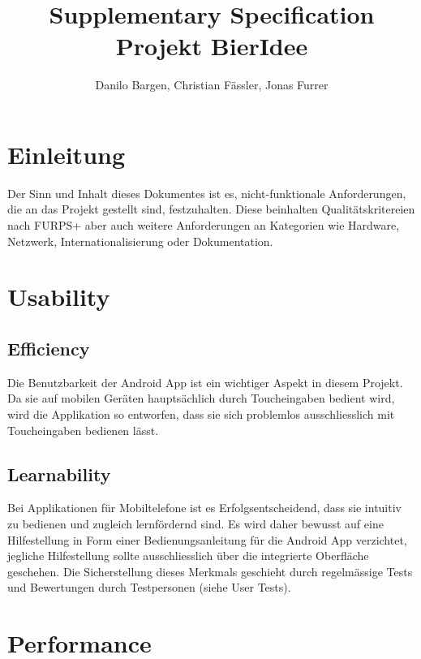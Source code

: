 \documentclass[10pt,a4paper]{scrartcl}
\author{Danilo Bargen, Christian Fässler, Jonas Furrer}
\title{Supplementary Specification \\Projekt BierIdee}
\subtitle{}
\begin{document}
\begin{titlepage}
	\maketitle
	\vspace{120mm}
	\thispagestyle{empty} %
\end{titlepage}


\newpage
	\tableofcontents
\newpage


\section{Einleitung}

Der Sinn und Inhalt dieses Dokumentes ist es, nicht-funktionale Anforderungen, die an das Projekt gestellt sind, festzuhalten. Diese beinhalten Qualitätskritereien nach FURPS+ aber auch weitere Anforderungen an Kategorien wie Hardware, Netzwerk, Internationalisierung oder Dokumentation.

\section{Usability}

	\subsection{Efficiency}

	Die Benutzbarkeit der Android App ist ein wichtiger Aspekt in diesem Projekt. Da sie auf mobilen Geräten hauptsächlich durch Toucheingaben bedient wird, wird die Applikation so entworfen, dass sie sich problemlos ausschliesslich mit Toucheingaben bedienen lässt.

	\subsection{Learnability}

	Bei Applikationen für Mobiltelefone ist es Erfolgsentscheidend, dass sie intuitiv zu bedienen und zugleich lernfördernd sind. Es wird daher bewusst auf eine Hilfestellung in Form einer Bedienungsanleitung für die Android App verzichtet, jegliche Hilfestellung sollte ausschliesslich über die integrierte Oberfläche geschehen. Die Sicherstellung dieses Merkmals geschieht durch regelmässige Tests und Bewertungen durch Testpersonen (siehe User Tests).


\section{Performance}
\end{document}

